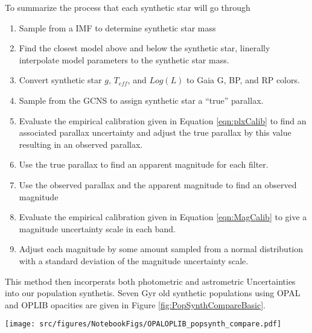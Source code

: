 To summarize the process that each synthetic star will go through
\begin{enumerate}
	\item Sample from a \citet{Sollima2019} IMF to determine synthetic star mass
	\item Find the closest model above and below the synthetic star, linerally
		interpolate model parameters to the synthetic star mass.
	\item Convert synthetic star $g$, $T_{eff}$, and $Log(L)$ to Gaia G, BP,
		and RP colors.
	\item Sample from the GCNS to assign synthetic star a ``true'' parallax.
	\item Evaluate the empirical calibration given in Equation
		\ref{eqn:plxCalib} to find an associated parallax uncertainty and
		adjust the true parallax by this value resulting in an observed
		parallax.
	\item Use the true parallax to find an apparent magnitude for each filter.
	\item Use the observed parallax and the apparent magnitude to find an
		observed magnitude
	\item Evaluate the empirical calibration given in Equation
		\ref{eqn:MagCalib} to give a magnitude uncertainty scale in each band.
	\item Adjust each magnitude by some amount sampled from a normal
		distribution with a standard deviation of the magnitude uncertainty
		scale.
\end{enumerate}

This method then incorperats both photometric and astrometric Uncertainties
into our population synthetis. Seven Gyr old synthetic populations using OPAL
and OPLIB opacities are given in Figure \ref{fig:PopSynthCompareBasic}.

\begin{figure*}
	\centering
	\texttt{[image: src/figures/NotebookFigs/OPALOPLIB\_popsynth\_compare.pdf]}
	\caption{Population synthetis resulst for models evolved with OPAL (left)
	and models evolved with OPLIB (right). A gaussian kernel-density-estimate
	has been overlayed to better highlight the density variations. {\color{red}
	[THIS IS A PLACEHOLDER FIGURE]}}
	\label{fig:PopSynthCompareBasic}
\end{figure*}
